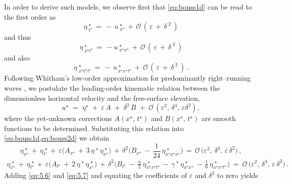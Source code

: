 \documentclass[alpha-refs, 12pt]{wiley-article}
\renewcommand{\O}{\mathcal{O}}
\newcommand{\eps}{\varepsilon}
\begin{document}
In order to derive such models, we observe first that \cref{eq:bouss1d} can be read to the first order as
\begin{equation*}
  \eta^{\;\star}_{\;t^{\star}}\,=\,-\,u^{\;\star}_{\;x^{\star}}\,+\,\O\,(\,\eps\,+\,\delta^{\;2}\,)
\end{equation*}
and thus
\begin{equation*}
  \eta^{\;\star}_{\;x^{\star}t^{\star}}\, = \,-u^{\;\star}_{\;x^{\star}x^{\star}}\,+\,\O\,(\,\eps\,+\,\delta^{\;2}\,)
\end{equation*}
and also
\begin{equation*}
  \eta^{\;\star}_{\;x^{\star}t^{\star}t^{\star}}\, = \,-\,u^{\;\star}_{\,x^{\star}x^{\star}t^{\star}}\,+\,\O\,(\,\eps\,+\,\delta^{\;2}\,)\,.
\end{equation*}
Following Whitham’s low-order approximation for predominantly right–running waves \cite{Whitham1999, Dutykh2007}, we postulate the leading-order kinematic relation between the dimensionless horizontal velocity and the free-surface elevation,
\begin{equation}\label{eq:relation}
  u^{\star}\;=\;\eta^{\star}\;+\;\eps\,A\;+\;\delta^{2}\,B\; + \;\O\,(\eps^{2},\,\delta^{4},\,\eps\delta^{2}),
\end{equation}
where the yet-unknown corrections $A(x^{\star},\,t^{\star})$ and $B(x^{\star},\,t^{\star})$ are smooth functions to be determined. Substituting this relation into \cref{eq:bouss1d,eq:bouss2d} we obtain
\begin{equation}\label{eq:5.6}
  \eta^{\;\star}_{x^{\star}}\,+\,\eta^{\;\star}_{t^{\star}}\,+\,
  \eps\bigl(A_{x^{\star}}\,+\,3\,\eta^{\;\star}\,\eta^{\;\star}_{x^{\star}}\bigr)\,+\,
  \delta^{2}\bigl(B_{x^{\star}}\,-\,\frac{1}{24}\,\eta^{\;\star}_{x^{\star}x^{\star}x^{\star}}\bigr)
  \,=\,\O\,\bigl(\eps^{2},\,\delta^{4},\,\eps\,\delta^{2}\bigr)\,,
\end{equation}
\begin{multline}\label{eq:5.7}
  \eta^{\;\star}_{x^{\star}}\,+\,\eta^{\;\star}_{t^{\star}}\,+\,
  \eps\bigl(A_{t^{\star}}\,+\,2\,\eta^{\;\star}\,\eta^{\;\star}_{x^{\star}}\bigr)\,+\,
  \delta^{2}\bigl(B_{t^{\star}}\,-\,\frac{\alpha}{2}\,\eta^{\;\star}_{x^{\star}x^{\star}t^{\star}}\,-\,
  \gamma^{\;\star}\,\eta^{\;\star}_{x^{\star}x^{\star}}\,-\,\frac{1}{6}\,\eta^{\;\star}_{x^{\star}x^{\star}t^{\star}}\bigr)\ =\ \O\,\bigl(\eps^{2},\,\delta^{4},\,\eps\,\delta^{2}\bigr)\,.
\end{multline}
Adding \cref{eq:5.6} and \cref{eq:5.7} and equating the coefficients of
$\eps$ and $\delta^{2}$ to zero yields
\end{document}
